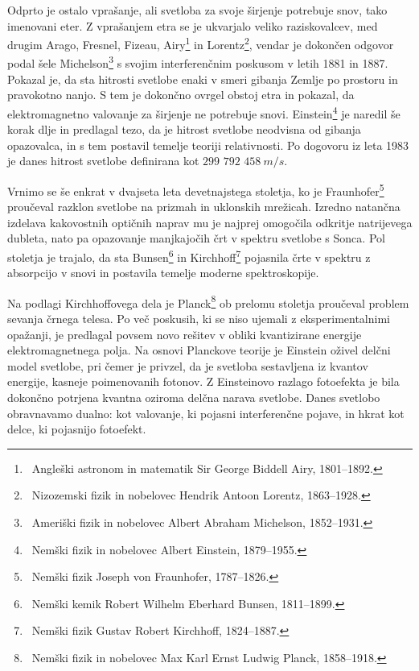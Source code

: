 Odprto je ostalo vprašanje, ali svetloba za svoje širjenje 
potrebuje snov, tako imenovani eter. Z vprašanjem etra se je 
ukvarjalo veliko raziskovalcev, med drugim Arago, Fresnel, Fizeau, 
Airy\footnote{~Angleški astronom in matematik Sir George Biddell Airy, 1801--1892.} 
in Lorentz\footnote{~Nizozemski fizik in nobelovec Hendrik Antoon Lorentz, 1863--1928.},
vendar je dokončen odgovor podal šele Michelson\footnote{~Ameriški fizik in nobelovec Albert
Abraham Michelson, 1852--1931.} s svojim 
interferenčnim poskusom v letih 1881 in 1887. Pokazal je, da
sta hitrosti svetlobe enaki v smeri gibanja Zemlje po prostoru in 
pravokotno nanjo. S tem je dokončno ovrgel obstoj etra in pokazal, 
da elektromagnetno valovanje za širjenje ne potrebuje snovi. 
Einstein\footnote{~Nemški fizik in nobelovec Albert Einstein, 1879--1955.} 
je naredil še korak dlje in predlagal tezo, da je hitrost 
svetlobe neodvisna od gibanja opazovalca, in s tem  postavil temelje 
teoriji relativnosti. Po dogovoru iz leta 1983 je danes 
hitrost svetlobe  definirana kot $299\,\,792\,\,458~\si{m/s}$. 

Vrnimo se še enkrat v dvajseta leta devetnajstega stoletja, ko je 
Fraunhofer\footnote{~Nemški fizik Joseph von Fraunhofer, 1787--1826.}
proučeval razklon svetlobe na prizmah in uklonskih mrežicah. Izredno
natančna izdelava kakovostnih optičnih naprav mu je najprej omogočila odkritje 
natrijevega dubleta, nato pa opazovanje manjkajočih črt v spektru
svetlobe s Sonca. Pol stoletja je trajalo, da
sta Bunsen\footnote{~Nemški kemik Robert Wilhelm Eberhard Bunsen, 1811--1899.}
in Kirchhoff\footnote{~Nemški fizik Gustav Robert Kirchhoff, 1824--1887.}
pojasnila črte v spektru z absorpcijo v snovi in postavila temelje
moderne spektroskopije.

Na podlagi Kirchhoffovega dela je Planck\footnote{~Nemški fizik in nobelovec
Max Karl Ernst Ludwig Planck, 1858--1918.} ob prelomu stoletja
proučeval problem sevanja črnega telesa. Po več poskusih, ki se niso
ujemali z eksperimentalnimi opažanji, je predlagal povsem novo rešitev 
v obliki kvantizirane energije elektromagnetnega polja. Na osnovi
Planckove teorije je Einstein oživel delčni model svetlobe, pri čemer
je privzel, da je svetloba sestavljena iz kvantov energije, kasneje 
poimenovanih fotonov. Z Einsteinovo razlago fotoefekta je bila dokončno
potrjena kvantna oziroma delčna narava svetlobe. Danes svetlobo obravnavamo
dualno: kot valovanje, ki pojasni interferenčne 
pojave, in hkrat kot delce, ki pojasnijo fotoefekt. 


